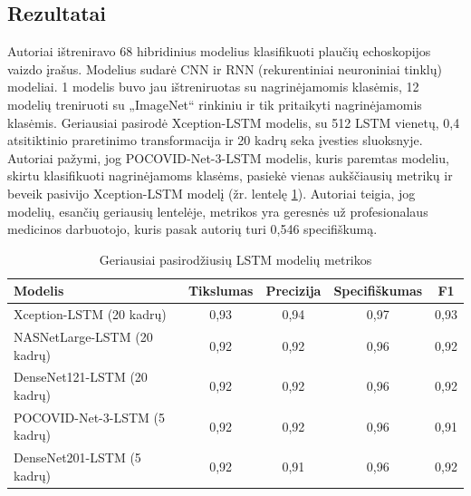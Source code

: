 \documentclass[fleqn]{VUMIFKompMagistrinis}
\begin{document}
\subsection{Rezultatai}
Autoriai ištreniravo 68 hibridinius modelius klasifikuoti plaučių echoskopijos vaizdo įrašus. Modelius sudarė CNN ir RNN (rekurentiniai neuroniniai tinklų) modeliai. 1 modelis buvo jau ištreniruotas su nagrinėjamomis klasėmis, 12 modelių treniruoti su „ImageNet“ rinkiniu ir tik pritaikyti nagrinėjamomis klasėmis. Geriausiai pasirodė Xception-LSTM modelis, su 512 LSTM vienetų, 0,4 atsitiktinio praretinimo transformacija ir 20 kadrų seka įvesties sluoksnyje. Autoriai pažymi, jog POCOVID-Net-3-LSTM modelis, kuris paremtas modeliu, skirtu klasifikuoti nagrinėjamoms klasėms, pasiekė vienas aukščiausių metrikų ir beveik pasivijo Xception-LSTM modelį (žr. lentelę \ref{tab:LSTM_rez}). Autoriai teigia, jog  modelių, esančių geriausių lentelėje, metrikos yra geresnės už profesionalaus medicinos darbuotojo, kuris pasak autorių turi 0,546 specifiškumą. \cite{LSTM}
\begin{table}[H]\footnotesize
  \centering
\caption{Geriausiai pasirodžiusių LSTM modelių metrikos \cite{LSTM}}
\begin{tabular}{|l|c|c|c|c|}
\hline
Modelis               & Tikslumas & Precizija   & Specifiškumas     & F1 \\ \hline
Xception-LSTM (20 kadrų)         & 0,93      & 0,94        &  0,97       & 0,93 \\ 
NASNetLarge-LSTM (20 kadrų)      & 0,92      & 0,92     &  0,96          & 0,92  \\
DenseNet121-LSTM (20 kadrų)      & 0,92      & 0,92     &  0,96          & 0,92  \\
POCOVID-Net-3-LSTM (5 kadrų)     & 0,92      & 0,92    & 0,96          & 0,91    \\
DenseNet201-LSTM (5 kadrų)      & 0,92      & 0,91     & 0,96           & 0,92  \\
\hline
  \end{tabular}
  \label{tab:LSTM_rez}
\end{table}
\end{document}
